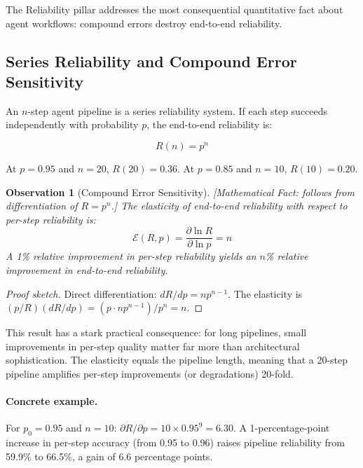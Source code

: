 \documentclass[11pt, a4paper]{googledeepmind}
\newtheorem{observation}{Observation}[section]
\begin{document}
The Reliability pillar addresses the most consequential quantitative fact about agent workflows: compound errors destroy end-to-end reliability.

\subsection{Series Reliability and Compound Error Sensitivity}

An $n$-step agent pipeline is a series reliability system. If each step succeeds independently with probability $p$, the end-to-end reliability is:

\begin{equation}
    R(n) = p^n
\end{equation}

At $p = 0.95$ and $n = 20$, $R(20) = 0.36$. At $p = 0.85$ and $n = 10$, $R(10) = 0.20$.

\begin{observation}[Compound Error Sensitivity]
\emph{[Mathematical Fact: follows from differentiation of $R = p^n$.]}
\label{thm:compound-sensitivity}
The elasticity of end-to-end reliability with respect to per-step reliability is:
\begin{equation}
    \mathcal{E}(R, p) = \frac{\partial \ln R}{\partial \ln p} = n
\end{equation}
A 1\% relative improvement in per-step reliability yields an $n$\% relative improvement in end-to-end reliability.
\end{observation}

\begin{proof}[Proof sketch]
Direct differentiation: $dR/dp = n p^{n-1}$. The elasticity is $(p/R)(dR/dp) = (p \cdot n p^{n-1}) / p^n = n$.
\end{proof}

This result has a stark practical consequence: for long pipelines, small improvements in per-step quality matter far more than architectural sophistication. The elasticity equals the pipeline length, meaning that a 20-step pipeline amplifies per-step improvements (or degradations) 20-fold.

\paragraph{Concrete example.} For $p_0 = 0.95$ and $n = 10$: $\partial R/\partial p = 10 \times 0.95^9 = 6.30$. A 1-percentage-point increase in per-step accuracy (from 0.95 to 0.96) raises pipeline reliability from 59.9\% to 66.5\%, a gain of 6.6 percentage points.
\end{document}
